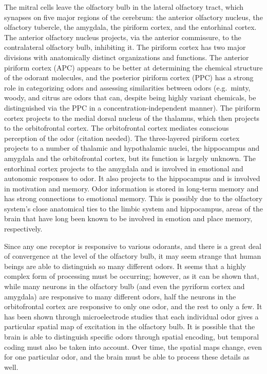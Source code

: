 \documentclass[]{book}
\begin{document}
The mitral cells leave the olfactory bulb in the lateral olfactory tract, which synapses on five major regions of the cerebrum: the anterior olfactory nucleus, the olfactory tubercle, the amygdala, the piriform cortex, and the entorhinal cortex. The anterior olfactory nucleus projects, via the anterior commissure, to the contralateral olfactory bulb, inhibiting it. The piriform cortex has two major divisions with anatomically distinct organizations and functions. The anterior piriform cortex (APC) appears to be better at determining the chemical structure of the odorant molecules, and the posterior piriform cortex (PPC) has a strong role in categorizing odors and assessing similarities between odors (e.g.~minty, woody, and citrus are odors that can, despite being highly variant chemicals, be distinguished via the PPC in a concentration-independent manner). The piriform cortex projects to the medial dorsal nucleus of the thalamus, which then projects to the orbitofrontal cortex. The orbitofrontal cortex mediates conscious perception of the odor (citation needed). The three-layered piriform cortex projects to a number of thalamic and hypothalamic nuclei, the hippocampus and amygdala and the orbitofrontal cortex, but its function is largely unknown. The entorhinal cortex projects to the amygdala and is involved in emotional and autonomic responses to odor. It also projects to the hippocampus and is involved in motivation and memory. Odor information is stored in long-term memory and has strong connections to emotional memory. This is possibly due to the olfactory system's close anatomical ties to the limbic system and hippocampus, areas of the brain that have long been known to be involved in emotion and place memory, respectively.

Since any one receptor is responsive to various odorants, and there is a great deal of convergence at the level of the olfactory bulb, it may seem strange that human beings are able to distinguish so many different odors. It seems that a highly complex form of processing must be occurring; however, as it can be shown that, while many neurons in the olfactory bulb (and even the pyriform cortex and amygdala) are responsive to many different odors, half the neurons in the orbitofrontal cortex are responsive to only one odor, and the rest to only a few. It has been shown through microelectrode studies that each individual odor gives a particular spatial map of excitation in the olfactory bulb. It is possible that the brain is able to distinguish specific odors through spatial encoding, but temporal coding must also be taken into account. Over time, the spatial maps change, even for one particular odor, and the brain must be able to process these details as well.
\end{document}
